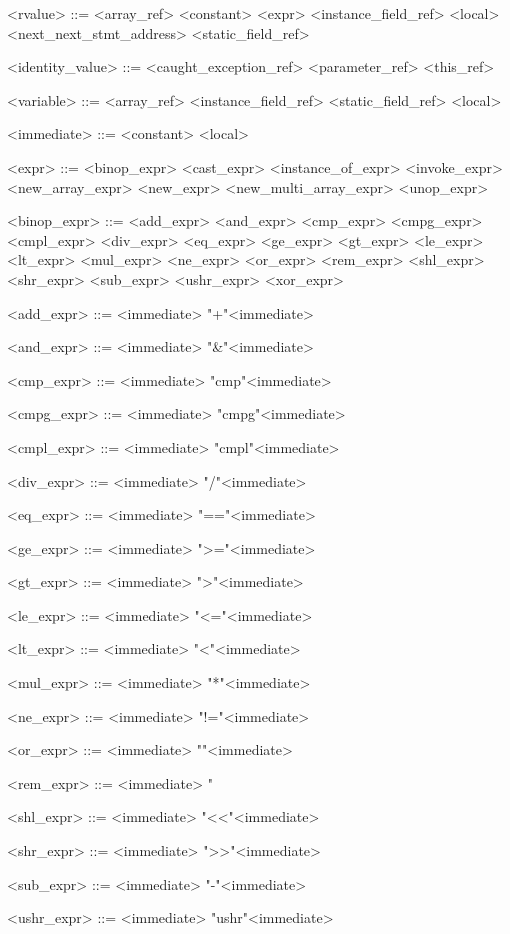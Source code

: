 \documentclass{report}
\begin{document}
\begin{grammar}
<rvalue> ::= <array_ref> \alt <constant> \alt <expr> \alt <instance_field_ref> \alt <local> <next_next_stmt_address> \alt <static_field_ref>

<identity_value> ::= <caught_exception_ref> \alt <parameter_ref> \alt <this_ref>

<variable> ::= <array_ref> \alt <instance_field_ref> \alt <static_field_ref> \alt <local>

<immediate> ::= <constant> \alt <local>

<expr> ::= <binop_expr> \alt <cast_expr> \alt <instance_of_expr> \alt <invoke_expr> \alt <new_array_expr> \alt <new_expr> \alt <new_multi_array_expr> \alt <unop_expr>

<binop_expr> ::= <add_expr> \alt <and_expr> \alt <cmp_expr> \alt <cmpg_expr> \alt <cmpl_expr> \alt <div_expr> \alt <eq_expr> \alt <ge_expr> \alt <gt_expr> \alt <le_expr> \alt <lt_expr> \alt <mul_expr> \alt <ne_expr> \alt <or_expr> \alt <rem_expr> \alt <shl_expr> \alt <shr_expr> \alt <sub_expr> \alt <ushr_expr> \alt <xor_expr>

<add_expr> ::= <immediate> "+"<immediate>

<and_expr> ::= <immediate> "&"<immediate>

<cmp_expr> ::= <immediate> "cmp"<immediate>

<cmpg_expr> ::= <immediate> "cmpg"<immediate>

<cmpl_expr> ::= <immediate> "cmpl"<immediate>

<div_expr> ::= <immediate> "/"<immediate>

<eq_expr> ::= <immediate> "=="<immediate>

<ge_expr> ::= <immediate> ">="<immediate>

<gt_expr> ::= <immediate> ">"<immediate>

<le_expr> ::= <immediate> "<="<immediate>

<lt_expr> ::= <immediate> "<"<immediate>

<mul_expr> ::= <immediate> "*"<immediate>

<ne_expr> ::= <immediate> "!="<immediate>

<or_expr> ::= <immediate> "\alt"<immediate>

<rem_expr> ::= <immediate> "%

<shl_expr> ::= <immediate> "<<"<immediate>

<shr_expr> ::= <immediate> ">>"<immediate>

<sub_expr> ::= <immediate> "-"<immediate>

<ushr_expr> ::= <immediate> "ushr"<immediate>


\end{grammar}
\end{document}

